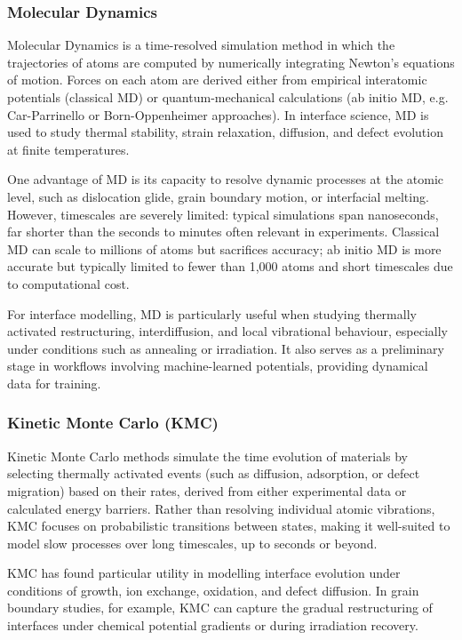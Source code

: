 \subsubsection{Molecular Dynamics}

Molecular Dynamics is a time-resolved simulation method in which the trajectories of atoms are computed by numerically integrating Newton's equations of motion. Forces on each atom are derived either from empirical interatomic potentials (classical MD) or quantum-mechanical calculations (ab initio MD, e.g. Car-Parrinello or Born-Oppenheimer approaches). In interface science, MD is used to study thermal stability, strain relaxation, diffusion, and defect evolution at finite temperatures.

One advantage of MD is its capacity to resolve dynamic processes at the atomic level, such as dislocation glide, grain boundary motion, or interfacial melting. However, timescales are severely limited: typical simulations span nanoseconds, far shorter than the seconds to minutes often relevant in experiments. Classical MD can scale to millions of atoms but sacrifices accuracy; ab initio MD is more accurate but typically limited to fewer than 1,000 atoms and short timescales due to computational cost.

For interface modelling, MD is particularly useful when studying thermally activated restructuring, interdiffusion, and local vibrational behaviour, especially under conditions such as annealing or irradiation. It also serves as a preliminary stage in workflows involving machine-learned potentials, providing dynamical data for training.

\subsubsection{Kinetic Monte Carlo (KMC)}

Kinetic Monte Carlo methods simulate the time evolution of materials by selecting thermally activated events (such as diffusion, adsorption, or defect migration) based on their rates, derived from either experimental data or calculated energy barriers. Rather than resolving individual atomic vibrations, KMC focuses on probabilistic transitions between states, making it well-suited to model slow processes over long timescales, up to seconds or beyond.

KMC has found particular utility in modelling interface evolution under conditions of growth, ion exchange, oxidation, and defect diffusion. In grain boundary studies, for example, KMC can capture the gradual restructuring of interfaces under chemical potential gradients or during irradiation recovery.


